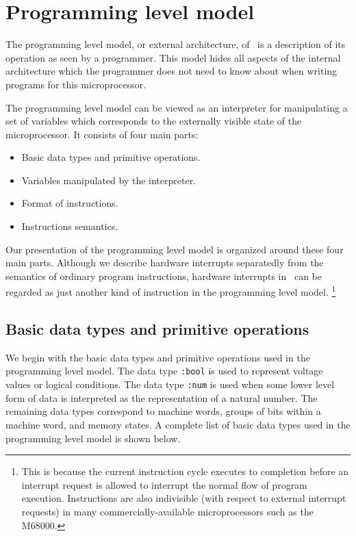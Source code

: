 \section{Programming level model}
\label{sec-progmodel}

The programming level model, or external architecture,
of \Tamarack\ is a description of its operation as seen by
a programmer.
This model hides
all aspects of the internal architecture
which the programmer does not need to know about when
writing programs for this microprocessor.

The programming level model can be viewed as an interpreter
for manipulating a set of variables which corresponds to the externally
visible state of the microprocessor.
It consists of four main parts:

\begin{itemize}
\item
Basic data types and primitive operations.
\item
Variables manipulated by the interpreter.
\item
Format of instructions.
\item
Instructions semantics.
\end{itemize}

Our presentation of the programming level model is organized
around these four main parts.
Although we describe hardware interrupts separatedly from the
semantics of ordinary program instructions,
hardware interrupts in \Tamarack\ can be regarded as just
another kind of instruction in the programming level model.
\footnote{
This is because the current instruction cycle executes to completion
before an interrupt request is allowed to interrupt the normal
flow of program execution.
Instructions are also indivisible (with respect to
external interrupt requests) in many commercially-available
microprocessors such as the M68000.}

\subsection{Basic data types and primitive operations}

We begin with the basic data types and primitive operations
used in the programming level model.
The data type \verb":bool" is used to represent voltage values
or logical conditions.
The data type \verb":num" is used when some lower level form
of data is interpreted as the representation of a natural number.
The remaining data types correspond to machine words,
groups of bits within a machine word,
and memory states.
A complete list of basic data types used in
the programming level model is shown below.

